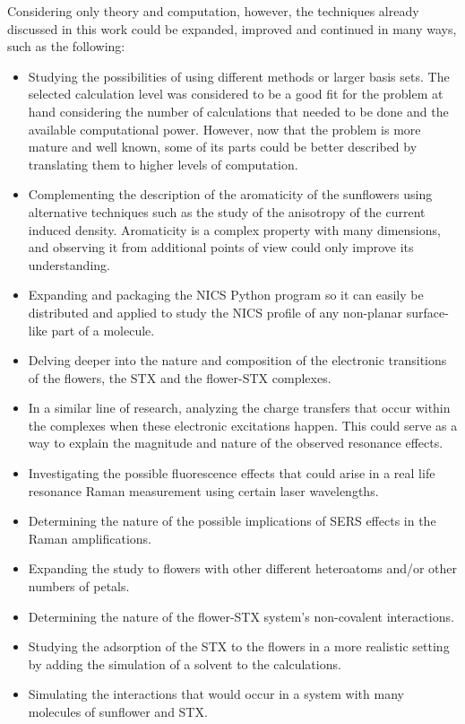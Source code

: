 Considering only theory and computation, however, the techniques already discussed in this work could be expanded, improved and continued in many ways, such as the following:

\begin{itemize}
    \item Studying the possibilities of using different methods or larger basis sets. The selected calculation level was considered to be a good fit for the problem at hand considering the number of calculations that needed to be done and the available computational power. However, now that the problem is more mature and well known, some of its parts could be better described by translating them to higher levels of computation.
    \item Complementing the description of the aromaticity of the sunflowers using alternative techniques such as the study of the anisotropy of the current induced density. Aromaticity is a complex property with many dimensions, and observing it from additional points of view could only improve its understanding.
    \item Expanding and packaging the NICS Python program so it can easily be distributed and applied to study the NICS profile of any non-planar surface-like part of a molecule.
    \item Delving deeper into the nature and composition of the electronic transitions of the flowers, the STX and the flower-STX complexes.
    \item In a similar line of research, analyzing the charge transfers that occur within the complexes when these electronic excitations happen. This could serve as a way to explain the magnitude and nature of the observed resonance effects.
    \item Investigating the possible fluorescence effects that could arise in a real life resonance Raman measurement using certain laser wavelengths.
    \item Determining the nature of the possible implications of SERS effects in the Raman amplifications.
    \item Expanding the study to flowers with other different heteroatoms and/or other numbers of petals.
    \item Determining the nature of the flower-STX system's non-covalent interactions.
    \item Studying the adsorption of the STX to the flowers in a more realistic setting by adding the simulation of a solvent to the calculations.
    \item Simulating the interactions that would occur in a system with many molecules of sunflower and STX.
\end{itemize}

